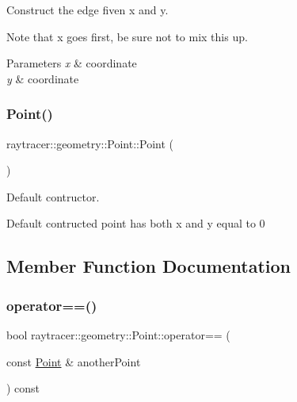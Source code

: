 Construct the edge fiven x and y. 

Note that x goes first, be sure not to mix this up. 
\begin{DoxyParams}{Parameters}
{\em x} & coordinate \\
\hline
{\em y} & coordinate \\
\hline
\end{DoxyParams}
\mbox{\label{classraytracer_1_1geometry_1_1Point_ac8c3dcaf9edb06b36bf3301348eb946a}} 
\subsubsection{\texorpdfstring{Point()}{Point()}\hspace{0.1cm}{\footnotesize\ttfamily [2/2]}}
{\footnotesize\ttfamily raytracer\+::geometry\+::\+Point\+::\+Point (\begin{DoxyParamCaption}{ }\end{DoxyParamCaption})\hspace{0.3cm}{\ttfamily [default]}}



Default contructor. 

Default contructed point has both x and y equal to 0 

\subsection{Member Function Documentation}
\mbox{\label{classraytracer_1_1geometry_1_1Point_ae363ee68a65544c87142d64433d790e0}} 
\subsubsection{\texorpdfstring{operator==()}{operator==()}}
{\footnotesize\ttfamily bool raytracer\+::geometry\+::\+Point\+::operator== (\begin{DoxyParamCaption}\item[{const \hyperlink{classraytracer_1_1geometry_1_1Point}{Point} \&}]{another\+Point }\end{DoxyParamCaption}) const}




